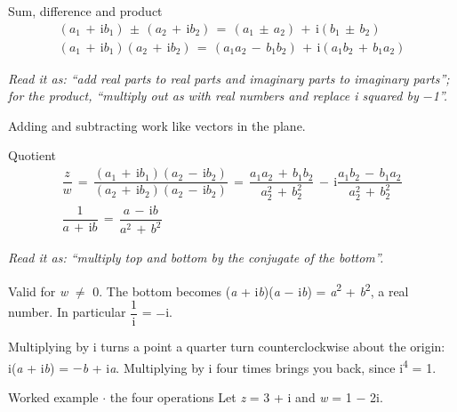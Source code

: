 \documentclass[11pt]{article}
\begin{document}
\begin{keepsection}
\begin{keepsection}
\begin{equationcard}{Sum, difference and product}
\[ \begin{gathered} ({a}_{1}\, +\, \mathrm{i}{b}_{1})\, \pm \, ({a}_{2}\, +\, \mathrm{i}{b}_{2})\, =\, ({a}_{1}\, \pm \, {a}_{2})\, +\, \mathrm{i}({b}_{1}\, \pm \, {b}_{2}) \\ ({a}_{1}\, +\, \mathrm{i}{b}_{1})({a}_{2}\, +\, \mathrm{i}{b}_{2})\, =\, ({a}_{1}{a}_{2}\, -\, {b}_{1}{b}_{2})\, +\, \mathrm{i}({a}_{1}{b}_{2}\, +\, {b}_{1}{a}_{2}) \end{gathered} \]
{\small \emph{Read it as: “add real parts to real parts and imaginary parts to imaginary parts”; for the product, “multiply out as with real numbers and replace i squared by \ensuremath{-}1”.}\par Adding and subtracting work like vectors in the plane.}
\end{equationcard}

\begin{equationcard}{Quotient}
\[ \begin{gathered} \dfrac{{z}}{{w}}\, =\, \dfrac{({a}_{1}\, +\, \mathrm{i}{b}_{1})({a}_{2}\, -\, \mathrm{i}{b}_{2})}{({a}_{2}\, +\, \mathrm{i}{b}_{2})({a}_{2}\, -\, \mathrm{i}{b}_{2})}\, =\, \dfrac{{a}_{1}{a}_{2}\, +\, {b}_{1}{b}_{2}}{{a}_{2}^{2}\, +\, {b}_{2}^{2}}\, -\, \mathrm{i}\dfrac{{a}_{1}{b}_{2}\, -\, {b}_{1}{a}_{2}}{{a}_{2}^{2}\, +\, {b}_{2}^{2}} \\ \dfrac{1}{{a}\, +\, \mathrm{i}{b}}\, =\, \dfrac{{a}\, -\, \mathrm{i}{b}}{{a}^{2}\, +\, {b}^{2}} \end{gathered} \]
{\small \emph{Read it as: “multiply top and bottom by the conjugate of the bottom”.}\par Valid for \textit{w} \ensuremath{\neq} 0. The bottom becomes (\textit{a} + i\textit{b})(\textit{a} \ensuremath{-} i\textit{b}) = \textit{a}\textsuperscript{2} + \textit{b}\textsuperscript{2}, a real number. In particular {\small\ensuremath{\dfrac{1}{\mathrm{i}}}} = \ensuremath{-}i.}
\end{equationcard}

Multiplying by i turns a point a quarter turn counterclockwise about the origin: i(\textit{a} + i\textit{b}) = \ensuremath{-}\textit{b} + i\textit{a}. Multiplying by i four times brings you back, since i\textsuperscript{4} = 1.

\begin{workedbox}{Worked example \ensuremath{\cdot} the four operations}
Let \textit{z} = 3 + i and \textit{w} = 1 \ensuremath{-} 2i.


\end{workedbox}
\end{keepsection}
\end{keepsection}
\end{document}
